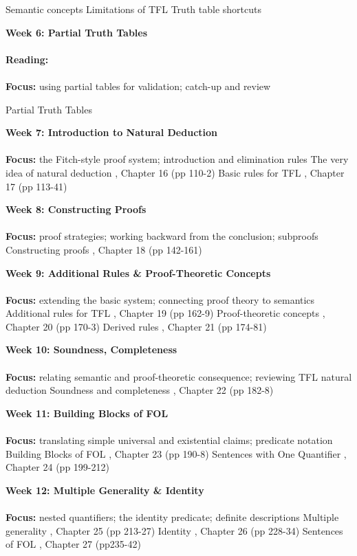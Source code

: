 \documentclass{article}
\begin{document}
\begin{outline}[enumerate]
\2 Semantic concepts
\2 Limitations of TFL
\2 Truth table shortcuts

\1 \textbf{Week 6: Partial Truth Tables}
\\
\\
\textbf{Reading:}
\cite[][Chapter 15 (pp. 102-8)]{Mag25}
\\
\\
\textbf{Focus:}
using partial tables for validation;
catch-up and review

\2 Partial Truth Tables

\1 \textbf{Week 7: Introduction to Natural Deduction}
\\
\\
\textbf{Focus:}
the Fitch-style proof system;
introduction and elimination rules
\2 The very idea of natural deduction \3 \cite{Mag25},  Chapter 16 (pp 110-2)
\2 Basic rules for TFL \3 \cite{Mag25},  Chapter 17 (pp 113-41)

\1 \textbf{Week 8: Constructing Proofs}
\\
\\
\textbf{Focus:}
proof strategies;
working backward from the conclusion;
subproofs
\2 Constructing proofs \3 \cite{Mag25},  Chapter 18 (pp 142-161)

\1 \textbf{Week 9: Additional Rules \& Proof-Theoretic Concepts}
\\
\\
\textbf{Focus:}
extending the basic system;
connecting proof theory to semantics
\2 Additional rules for TFL \3 \cite{Mag25},  Chapter 19 (pp 162-9)
\2 Proof-theoretic concepts \3 \cite{Mag25},  Chapter 20 (pp 170-3)
\2 Derived rules \3 \cite{Mag25},  Chapter 21 (pp 174-81)

\1 \textbf{Week 10: Soundness, Completeness}
\\
\\
\textbf{Focus:}
relating semantic and proof-theoretic consequence;
reviewing TFL natural deduction
\2 Soundness and completeness \3 \cite{Mag25},  Chapter 22 (pp 182-8)

\1 \textbf{Week 11: Building Blocks of FOL}
\\
\\
\textbf{Focus:}
translating simple universal and existential claims;
predicate notation
\2 Building Blocks of FOL \3 \cite{Mag25},  Chapter 23 (pp 190-8)
\2 Sentences with One Quantifier \3 \cite{Mag25},  Chapter 24 (pp 199-212)

\1 \textbf{Week 12: Multiple Generality \& Identity}
\\
\\
\textbf{Focus:}
nested quantifiers;
the identity predicate;
definite descriptions
\2 Multiple generality \3 \cite{Mag25},  Chapter 25 (pp 213-27)
\2 Identity \3 \cite{Mag25},  Chapter 26 (pp 228-34)
\2 Sentences of FOL \3 \cite{Mag25},  Chapter 27 (pp235-42)


\end{outline}
\end{document}
